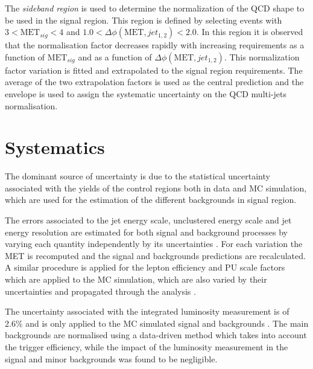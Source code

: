 The \textit{sideband region} is used to determine the normalization of the \gls{QCD} shape to be used in the signal region. This region is defined by selecting events with $3<\text{MET}_{sig}<4$ and $1.0<\Delta\phi(\text{MET},jet_{1,2})<2.0$. In this region it is observed that the normalisation factor decreases rapidly with increasing requirements as a function of $\text{MET}_{sig}$ and as a function of $\Delta\phi(\text{MET},jet_{1,2})$. This normalization factor variation is fitted and extrapolated to the signal region requirements. The average of the two extrapolation factors is used as the central prediction and the envelope is used to assign the systematic uncertainty on the \gls{QCD} multi-jets normalisation.

\section{Systematics}


The dominant source of uncertainty is due to the statistical uncertainty associated with the yields of the control regions both in data and \gls{MC} simulation, which are used for the estimation of the different backgrounds in signal region. 

The errors associated to the jet energy scale, unclustered energy scale and jet energy resolution are estimated for both signal and background processes by varying each quantity independently by its uncertainties \cite{ARTICLE:CMSDeterminationJetEnergyCalibration}. For each variation the \gls{MET} is recomputed and the signal and backgrounds predictions are recalculated. A similar procedure is applied for the lepton efficiency and \gls{PU} scale factors which are applied to the \gls{MC} simulation, which are also varied by their uncertainties and propagated through the analysis \cite{ARTICLE:CMSMuonReconstruction7TeV,ARTICLE:CMSElectronReconstruction8TeV}.

The uncertainty associated with the integrated luminosity measurement is of 2.6\% and is only applied to the \gls{MC} simulated signal and backgrounds \cite{ARTICLE:CMSLuminosityBasedonPixelClusterCounting}. The main backgrounds are normalised using a data-driven method which takes into account the trigger efficiency, while the impact of the luminosity measurement in the signal and minor backgrounds was found to be negligible.

